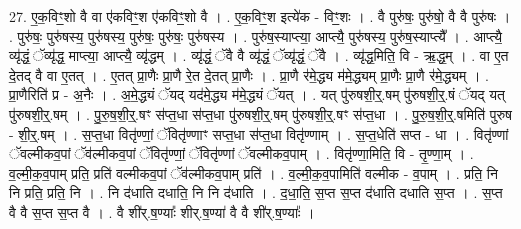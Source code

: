 \documentclass[17pt]{extarticle}
\begin{document}
27. ए॒क॒विꣳ॒॒शो वै वा ए॑कविꣳ॒॒श ए॑कविꣳ॒॒शो वै । . ए॒क॒विꣳ॒॒श इत्ये॑क - विꣳ॒॒शः । . वै पुरु॑षः॒ पुरु॑षो॒ वै वै पुरु॑षः । . पुरु॑षः॒ पुरु॑षस्य॒ पुरु॑षस्य॒ पुरु॑षः॒ पुरु॑षः॒ पुरु॑षस्य । . पुरु॑ष॒स्याप्त्या॒ आप्त्यै॒ पुरु॑षस्य॒ पुरु॑ष॒स्याप्त्यै᳚ । . आप्त्यै॒ व्यृ॑द्धं॒ ॅव्यृ॑द्ध॒ माप्त्या॒ आप्त्यै॒ व्यृ॑द्धम् । . व्यृ॑द्धं॒ ॅवै वै व्यृ॑द्धं॒ ॅव्यृ॑द्धं॒ ॅवै । . व्यृ॑द्ध॒मिति॒ वि - ऋ॒द्ध॒म् । . वा ए॒त दे॒तद् वै वा ए॒तत् । . ए॒तत् प्रा॒णैः प्रा॒णै रे॒त दे॒तत् प्रा॒णैः । . प्रा॒णै र॑मे॒द्ध्य म॑मे॒द्ध्यम् प्रा॒णैः प्रा॒णै र॑मे॒द्ध्यम् । . प्रा॒णैरिति॑ प्र - अ॒नैः । . अ॒मे॒द्ध्यं ॅयद् यद॑मे॒द्ध्य म॑मे॒द्ध्यं ॅयत् । . यत् पु॑रुषशी॒र्॒.षम् पु॑रुषशी॒र्॒.षं ॅयद् यत् पु॑रुषशी॒र्॒.षम् । . पु॒रु॒ष॒शी॒र्॒.षꣳ स॑प्त॒धा स॑प्त॒धा पु॑रुषशी॒र्॒.षम् पु॑रुषशी॒र्॒.षꣳ स॑प्त॒धा । . पु॒रु॒ष॒शी॒र्॒.षमिति॑ पुरुष - शी॒र्॒.षम् । . स॒प्त॒धा वितृ॑ण्णां॒ ॅवितृ॑ण्णाꣳ सप्त॒धा स॑प्त॒धा वितृ॑ण्णाम् । . स॒प्त॒धेति॑ सप्त - धा । . वितृ॑ण्णां ॅवल्मीकव॒पां ॅव॑ल्मीकव॒पां ॅवितृ॑ण्णां॒ ॅवितृ॑ण्णां ॅवल्मीकव॒पाम् । . वितृ॑ण्णा॒मिति॒ वि - तृ॒ण्णा॒म् । . व॒ल्मी॒क॒व॒पाम् प्रति॒ प्रति॑ वल्मीकव॒पां ॅव॑ल्मीकव॒पाम् प्रति॑ । . व॒ल्मी॒क॒व॒पामिति॑ वल्मीक - व॒पाम् । . प्रति॒ नि नि प्रति॒ प्रति॒ नि । . नि द॑धाति दधाति॒ नि नि द॑धाति । . द॒धा॒ति॒ स॒प्त स॒प्त द॑धाति दधाति स॒प्त । . स॒प्त वै वै स॒प्त स॒प्त वै । . वै शी॑र्.ष॒ण्याः᳚ शीर्.ष॒ण्या॑ वै वै शी॑र्.ष॒ण्याः᳚ । \newline
\end{document}
